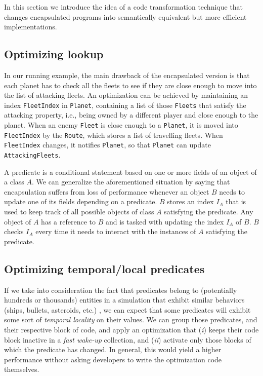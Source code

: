 In this section we introduce the idea of a code transformation technique that changes encapsulated programs into semantically equivalent but more efficient implementations.

\subsection{Optimizing lookup}

In our running example, the main drawback of the encapsulated version is that each planet has to check all the fleets to see if they are close enough to move into the list of attacking fleets. An optimization can be achieved by maintaining an index \texttt{FleetIndex} in \texttt{Planet}, containing a list of those \texttt{Fleets} that satisfy the attacking property, i.e., being owned by a different player and close enough to the planet. When an enemy \texttt{Fleet} is close enough to a \texttt{Planet}, it is moved into \texttt{FleetIndex} by the \texttt{Route}, which stores a list of travelling fleets. When \texttt{FleetIndex} changes, it notifies \texttt{Planet}, so that \texttt{Planet} can update \texttt{AttackingFleets}.

A predicate is a conditional statement based on one or more fields of an object of a class $A$. We can generalize the aforementioned situation by saying that encapsulation suffers from loss of performance whenever an object $B$ needs to update one of its fields depending on a predicate. $B$ stores an index $I_{A}$ that is used to keep track of all possible objects of class $A$ satisfying the predicate. Any object of $A$ has a reference to $B$ and is tasked with updating the index $I_{A}$ of $B$. $B$ checks $I_{A}$ every time it needs to interact with the instances of $A$ satisfying the predicate.

\subsection{Optimizing temporal/local predicates}

If we take into consideration the fact that predicates belong to (potentially hundreds or thousands) entities in a simulation that exhibit similar behaviors (ships, bullets, asteroids, etc.) \cite{ai_dithering}, we can expect that some predicates will exhibit some sort of \textit{temporal locality} on their values. We can group those predicates, and their respective block of code, and apply an optimization that (\textit{i}) keeps their code block inactive in a \textit{fast wake-up} collection, and (\textit{ii}) activate only those blocks of which the predicate has changed. In general, this would yield a higher performance without asking developers to write the optimization code themselves.


